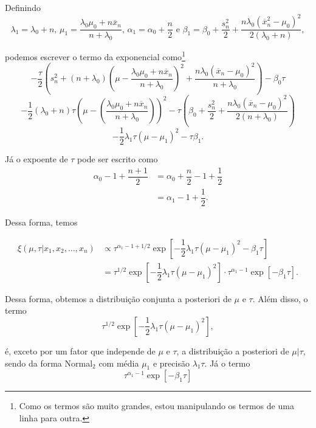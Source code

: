\documentclass{article}
\begin{document}
Definindo
\[\lambda_1 = \lambda_0 + n \text{, } \mu_1 = \dfrac{\lambda_0\mu_0 + n\overline{x}_n}{n + \lambda_0} \text{, } \alpha_1 = \alpha_0 + \dfrac{n}{2} \text{ e } \beta_1 = \beta_0 + \dfrac{s_n^2}{2} + \dfrac{n\lambda_0\left(\overline{x}_n^2 - \mu_0\right)^2}{2\left(\lambda_0 + n\right)},\]

\noindent podemos escrever o termo da exponencial como\footnote{Como os termos são muito grandes, estou manipulando os termos de uma linha para outra.}
\[-\dfrac{\tau}{2}\left(s_n^2 + (n + \lambda_0)\left(\mu - \dfrac{\lambda_0\mu_0 + n\overline{x}_n}{n + \lambda_0}\right)^2 + \dfrac{n\lambda_0 \left(\overline{x}_n - \mu_0\right)^2}{n + \lambda_0}\right) - \beta_0 \tau\]
\[-\dfrac{1}{2}\left(\lambda_0 + n\right)\tau\left(\mu - \left(\dfrac{\lambda_0\mu_0 + n\overline{x}_n}{n + \lambda_0}\right)\right)^2 - \tau\left(\beta_0 + \dfrac{s_n^2}{2} + \dfrac{n\lambda_0 \left(\overline{x}_n - \mu_0\right)^2}{2\left(n + \lambda_0\right)}\right)\]
\[-\dfrac{1}{2}\lambda_1\tau\left(\mu - \mu_1\right)^2 - \tau\beta_1.\]

Já o expoente de $\tau$ pode ser escrito como
\begin{equation*}
    \begin{split}
        \alpha_0 - 1 + \dfrac{n + 1}{2} & = \alpha_0 + \dfrac{n}{2} - 1 + \dfrac{1}{2} \\
        & = \alpha_1 - 1 + \dfrac{1}{2}.
    \end{split}
\end{equation*}

Dessa forma, temos

\begin{equation*}
    \begin{split}
        \xi(\mu, \tau | x_1, x_2, \dots, x_n) & \propto \tau^{\alpha_1 - 1 + 1/2} \exp{\left[-\dfrac{1}{2}\lambda_1\tau\left(\mu - \mu_1\right)^2 -\beta_1\tau\right]} \\
        & = \tau^{1/2} \exp{\left[-\dfrac{1}{2}\lambda_1\tau\left(\mu - \mu_1\right)^2\right]} \cdot \tau^{\alpha_1 - 1} \exp{\left[-\beta_1\tau\right]}.
    \end{split}
\end{equation*}

Dessa forma, obtemos a distribuição conjunta a posteriori de $\mu$ e $\tau$. Além disso, o termo
\[\tau^{1/2} \exp{\left[-\dfrac{1}{2}\lambda_1\tau\left(\mu - \mu_1\right)^2\right]},\]

\noindent é, exceto por um fator que independe de $\mu$ e $\tau$, a distribuição a posteriori de $\mu | \tau$, sendo da forma Normal$_2$ com média $\mu_1$ e precisão $\lambda_1\tau$. Já o termo
\[\tau^{\alpha_1 - 1} \exp{\left[-\beta_1\tau\right]}\]
\end{document}
